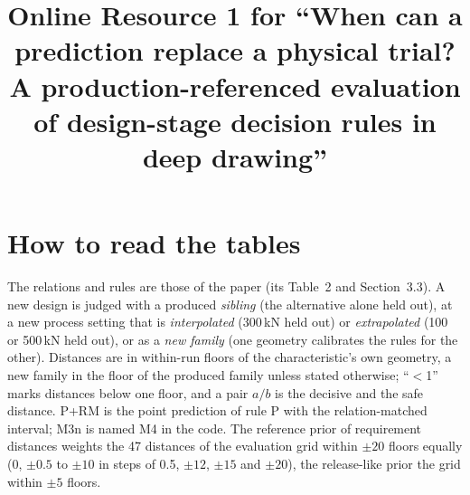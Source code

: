 \documentclass[pdflatex,sn-basic]{sn-jnl}
\begin{document}
\title[Online Resource 1]{Online Resource 1 for ``When can a prediction replace a physical trial? A production-referenced evaluation of design-stage decision rules in deep drawing''}

\author*[1]{ }


\maketitle

\section{How to read the tables}

The relations and rules are those of the paper (its Table~2 and Section~3.3). A new design is judged with a produced \emph{sibling} (the alternative alone held out), at a new process setting that is \emph{interpolated} (300\,kN held out) or \emph{extrapolated} (100 or 500\,kN held out), or as a \emph{new family} (one geometry calibrates the rules for the other). Distances are in within-run floors of the characteristic's own geometry, a new family in the floor of the produced family unless stated otherwise; ``$<$1'' marks distances below one floor, and a pair $a/b$ is the decisive and the safe distance. P+RM is the point prediction of rule P with the relation-matched interval; M3n is named M4 in the code. The reference prior of requirement distances weights the 47 distances of the evaluation grid within $\pm20$ floors equally (0, $\pm0.5$ to $\pm10$ in steps of 0.5, $\pm12$, $\pm15$ and $\pm20$), the release-like prior the grid within $\pm5$ floors.
\end{document}
